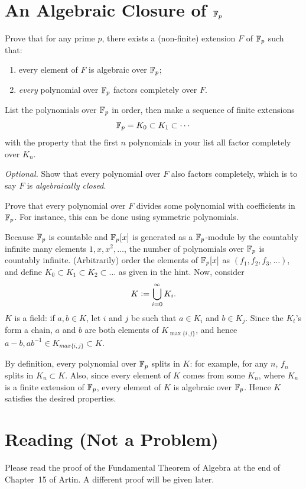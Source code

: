 \documentclass[12pt]{article}
\begin{document}
\section{An Algebraic Closure of \texorpdfstring{$\mathbb{F}_p$}{F\_p}}
 
Prove that for any prime $p$, there exists a (non-finite) extension $F$ of $\mathbb{F}_p$ such that:
\begin{enumerate}[label=(\roman*)]
  \item every element of $F$ is algebraic over $\mathbb{F}_p$;
  \item \emph{every} polynomial over $\mathbb{F}_p$ factors completely over $F$.
\end{enumerate}
 
\begin{hint}
List the polynomials over $\mathbb{F}_p$ in order, then make a sequence of finite extensions
\[
  \mathbb{F}_p = K_0 \subset K_1 \subset \cdots
\]
with the property that the first $n$ polynomials in your list all factor completely over $K_n$.
\end{hint}
 
\noindent\textit{Optional.} Show that every polynomial over $F$ also factors completely, which is to say $F$ is \emph{algebraically closed}.
 
\begin{hint}
Prove that every polynomial over $F$ divides some polynomial with coefficients in $\mathbb{F}_p$. For instance, this can be done using symmetric polynomials.
\end{hint}

\noindent\dotfill 

Because $\mathbb{F}_p$ is countable and $\mathbb{F}_p[x]$ is generated as a $\mathbb{F}_p$-module by the countably infinite many elements $1, x, x^2, \ldots$, the number of polynomials over $\mathbb{F}_p$ is countably infinite. 
(Arbitrarily) order the elements of $\mathbb{F}_p[x]$ as $(f_1, f_2, f_3, \ldots)$, and define $K_0 \subset K_1 \subset K_2 \subset \ldots$ as given in the hint. 
Now, consider 
$$K \vcentcolon= \bigcup_{i = 0}^{\infty} K_i.$$
$K$ is a field:
if $a, b \in K$, let $i$ and $j$ be such that $a \in K_i$ and $b \in K_j$. 
Since the $K_t$'s form a chain, $a$ and $b$ are both elements of $K_{\max\{i, j\}}$, and hence $a - b, ab^{-1} \in K_{max\{i, j\}} \subset K$.  

By definition, every polynomial over $\mathbb{F}_p$ splits in $K$: 
for example, for any $n$, $f_n$ splits in $K_n \subset K$. 
Also, since every element of $K$ comes from some $K_n$, where $K_n$ is a finite extension of $\mathbb{F}_p$, every element of $K$ is algebraic over $\mathbb{F}_p$. 
Hence $K$ satisfies the desired properties. 

 
\section*{Reading (Not a Problem)}
 
Please read the proof of the Fundamental Theorem of Algebra at the end of Chapter~15 of Artin. A different proof will be given later.
\end{document}
